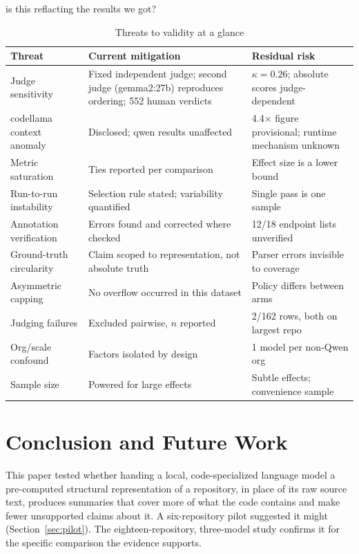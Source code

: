 is this reflacting the results we got?\documentclass[conference]{IEEEtran}
\begin{document}
\begin{table}[htbp]
\caption{Threats to validity at a glance}
\label{tab:threats}
\centering
\footnotesize
\begin{tabular}{@{}p{1.55cm}p{2.7cm}p{2.0cm}@{}}
\toprule
Threat & Current mitigation & Residual risk \\
\midrule
Judge sensitivity & Fixed independent judge; second judge (gemma2:27b) reproduces ordering; 552 human verdicts & $\kappa=0.26$; absolute scores judge-dependent \\
codellama context anomaly & Disclosed; qwen results unaffected & 4.4$\times$ figure provisional; runtime mechanism unknown \\
Metric saturation & Ties reported per comparison & Effect size is a lower bound \\
Run-to-run instability & Selection rule stated; variability quantified & Single pass is one sample \\
Annotation verification & Errors found and corrected where checked & 12/18 endpoint lists unverified \\
Ground-truth circularity & Claim scoped to representation, not absolute truth & Parser errors invisible to coverage \\
Asymmetric capping & No overflow occurred in this dataset & Policy differs between arms \\
Judging failures & Excluded pairwise, $n$ reported & 2/162 rows, both on largest repo \\
Org/scale confound & Factors isolated by design & 1 model per non-Qwen org \\
Sample size & Powered for large effects & Subtle effects; convenience sample \\
\bottomrule
\end{tabular}
\end{table}

\section{Conclusion and Future Work}
\label{sec:futurework}

This paper tested whether handing a local, code-specialized language model a pre-computed
structural representation of a repository, in place of its raw source text, produces summaries
that cover more of what the code contains and make fewer unsupported claims about it. A
six-repository pilot suggested it might (Section~\ref{sec:pilot}). The eighteen-repository,
three-model study confirms it for the specific comparison the evidence supports.
\end{document}

